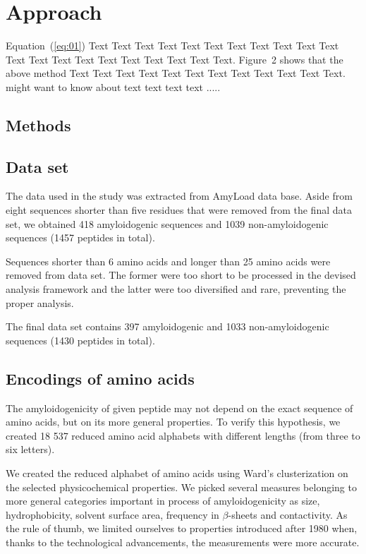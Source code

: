 \documentclass{bioinfo}
\begin{document}

\section{Approach}

Equation~(\ref{eq:01}) Text Text Text Text Text Text  Text Text
Text Text Text Text Text Text Text Text Text Text Text Text Text.
Figure~2\vphantom{\ref{fig:02}} shows that the above method  Text
Text Text Text  Text Text Text Text Text Text  Text Text.
\citealp{Boffelli03} might want to know about text text text text
.....


\begin{methods}
\section{Methods}

\subsection{Data set}

The data used in the study was extracted from AmyLoad data base. Aside from eight sequences shorter than five residues that were removed from the final data set, we obtained 418 amyloidogenic sequences and 1039 non-amyloidogenic sequences (1457 peptides in total).

Sequences shorter than 6 amino acids and longer than 25 amino acids were removed from data set. The former were too short to be processed in the devised analysis framework and the latter were too diversified and rare, preventing the proper analysis.

The final data set contains 397 amyloidogenic and 1033 non-amyloidogenic sequences (1430 peptides in total).

\subsection{Encodings of amino acids}

The amyloidogenicity of given peptide may not depend on the exact sequence of amino acids, but on its more general properties. To verify this hypothesis, we created 18 537 reduced amino acid alphabets with different lengths (from three to six letters).

We created the reduced alphabet of amino acids using Ward's clusterization on the selected physicochemical properties. We picked several measures belonging to more general categories important in process of amyloidogenicity as size, hydrophobicity, solvent surface area, frequency in $\beta$-sheets and contactivity. As the rule of thumb, we limited ourselves to properties introduced after 1980 when, thanks to the technological advancements, the measurements were more accurate.


\end{methods}
\end{document}
